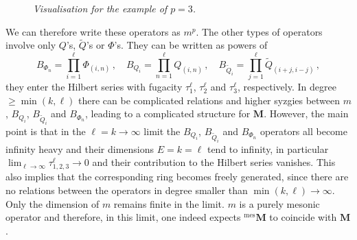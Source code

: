\documentclass[main.tex]{subfiles}
\begin{document}
\begin{figure}
\begin{subfigure}[t]{0.45\textwidth}
  \end{subfigure}
  \caption{\it Visualisation for the example of $p=3$.}
  \label{fig:pathexample}
\end{figure}
We can therefore write these operators as $m^p$. The other types of operators involve only $Q$'s, $\widetilde{Q}$'s or $\Phi$'s. They can be written as powers of
\begin{equation}
B_{\Phi_n}=\prod_{i=1}^{\ell}\Phi_{(i,n)}\,,\quad B_{Q_i}=\prod_{n=1}^{\ell}Q_{(i,n)}\,,\quad B_{\widetilde{Q}_i}=\prod_{j=1}^{\ell}\widetilde{Q}_{(i+j,i-j)}\,,
\end{equation}
they enter the Hilbert series with fugacity $\tau_1^{\ell}$, $\tau_2^{\ell}$ and $\tau_3^{\ell}$, respectively. In degree $\geq\min(k,\ell)$ there can be complicated relations and higher syzgies between $m$, $B_{Q_i}$, $B_{\widetilde{Q}_i}$ and $B_{\Phi_n}$, leading to a complicated structure for $\mathbf{M}$. However, the main point is that in the $\ell=k\to\infty$ limit the $B_{Q_i}$, $B_{\widetilde{Q}_i}$ and $B_{\Phi_n}$ operators all become infinity heavy and their dimensions $E=k=\ell$ tend to infinity, in particular $\lim_{\ell\to\infty}\tau_{1,2,3}^{\ell}\to0$ and their contribution to the Hilbert series vanishes. This also implies that the corresponding ring becomes freely generated, since there are no relations between the operators in degree smaller than $\min(k,\ell)\to\infty$. Only the dimension of $m$ remains finite in the limit. $m$ is a purely mesonic operator and therefore, in this limit, one indeed expects ${}^{\text{mes}}\mathbf{M}$ to coincide with $\mathbf{M}$. 
\end{document}
